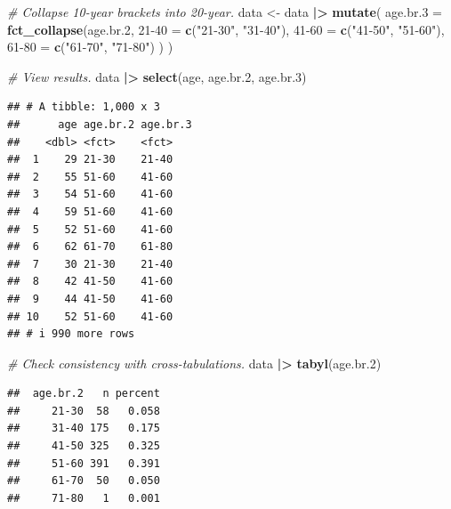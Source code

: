 \documentclass[
]{book}
\newenvironment{Shaded}{\begin{snugshade}}{\end{snugshade}}
\newcommand{\AttributeTok}[1]{\textcolor[rgb]{0.13,0.29,0.53}{#1}}
\newcommand{\CommentTok}[1]{\textcolor[rgb]{0.56,0.35,0.01}{\textit{#1}}}
\newcommand{\FloatTok}[1]{\textcolor[rgb]{0.00,0.00,0.81}{#1}}
\newcommand{\FunctionTok}[1]{\textcolor[rgb]{0.13,0.29,0.53}{\textbf{#1}}}
\newcommand{\NormalTok}[1]{#1}
\newcommand{\OtherTok}[1]{\textcolor[rgb]{0.56,0.35,0.01}{#1}}
\newcommand{\SpecialCharTok}[1]{\textcolor[rgb]{0.81,0.36,0.00}{\textbf{#1}}}
\newcommand{\StringTok}[1]{\textcolor[rgb]{0.31,0.60,0.02}{#1}}
\begin{document}
\begin{Shaded}
\begin{Highlighting}[]
\CommentTok{\# Collapse 10{-}year brackets into 20{-}year.}
\NormalTok{data }\OtherTok{\textless{}{-}}\NormalTok{ data }\SpecialCharTok{|\textgreater{}} 
  \FunctionTok{mutate}\NormalTok{(}
    \AttributeTok{age.br.3 =} \FunctionTok{fct\_collapse}\NormalTok{(age.br}\FloatTok{.2}\NormalTok{,}
      \StringTok{\textasciigrave{}}\AttributeTok{21{-}40}\StringTok{\textasciigrave{}} \OtherTok{=} \FunctionTok{c}\NormalTok{(}\StringTok{"21{-}30"}\NormalTok{, }\StringTok{"31{-}40"}\NormalTok{),}
      \StringTok{\textasciigrave{}}\AttributeTok{41{-}60}\StringTok{\textasciigrave{}} \OtherTok{=} \FunctionTok{c}\NormalTok{(}\StringTok{"41{-}50"}\NormalTok{, }\StringTok{"51{-}60"}\NormalTok{),}
      \StringTok{\textasciigrave{}}\AttributeTok{61{-}80}\StringTok{\textasciigrave{}} \OtherTok{=} \FunctionTok{c}\NormalTok{(}\StringTok{"61{-}70"}\NormalTok{, }\StringTok{"71{-}80"}\NormalTok{)}
\NormalTok{    )}
\NormalTok{  )}

\CommentTok{\# View results.}
\NormalTok{data }\SpecialCharTok{|\textgreater{}} 
  \FunctionTok{select}\NormalTok{(age, age.br}\FloatTok{.2}\NormalTok{, age.br}\FloatTok{.3}\NormalTok{)}
\end{Highlighting}
\end{Shaded}

\begin{verbatim}
## # A tibble: 1,000 x 3
##      age age.br.2 age.br.3
##    <dbl> <fct>    <fct>   
##  1    29 21-30    21-40   
##  2    55 51-60    41-60   
##  3    54 51-60    41-60   
##  4    59 51-60    41-60   
##  5    52 51-60    41-60   
##  6    62 61-70    61-80   
##  7    30 21-30    21-40   
##  8    42 41-50    41-60   
##  9    44 41-50    41-60   
## 10    52 51-60    41-60   
## # i 990 more rows
\end{verbatim}

\begin{Shaded}
\begin{Highlighting}[]
\CommentTok{\# Check consistency with cross{-}tabulations. }
\NormalTok{data }\SpecialCharTok{|\textgreater{}} 
  \FunctionTok{tabyl}\NormalTok{(age.br}\FloatTok{.2}\NormalTok{)}
\end{Highlighting}
\end{Shaded}

\begin{verbatim}
##  age.br.2   n percent
##     21-30  58   0.058
##     31-40 175   0.175
##     41-50 325   0.325
##     51-60 391   0.391
##     61-70  50   0.050
##     71-80   1   0.001
\end{verbatim}
\end{document}
